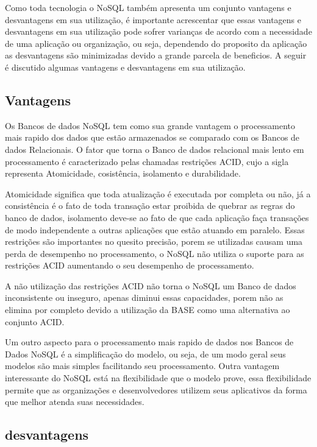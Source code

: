 \documentclass[12pt]{article}
\begin{document}
Como toda tecnologia o NoSQL também apresenta um conjunto vantagens e desvantagens em sua utilização, é importante acrescentar que essas vantagens e desvantagens em sua utilização pode sofrer varianças de acordo com a necessidade de uma aplicação ou organização, ou seja, dependendo do proposito da aplicação as desvantagens são minimizadas devido a grande parcela de beneficios. A seguir é discutido algumas vantagens e desvantagens em sua utilização.

\subsection{Vantagens}
\label{subsec:vantagens}

Os Bancos de dados NoSQL tem como sua grande vantagem o processamento mais rapido dos dados que estão armazenados se comparado com os Bancos de dados Relacionais. O fator que torna o Banco de dados relacional mais lento em processamento é caracterizado pelas chamadas restrições ACID, cujo a sigla representa Atomicidade, cosistência, isolamento e durabilidade. 

Atomicidade significa que toda atualização é executada por completa ou não, já a consistência é o fato de toda transação estar proibida de quebrar as regras do banco de dados, isolamento deve-se ao fato de que cada aplicação faça transações de modo independente a outras aplicações que estão atuando em paralelo. Essas restrições são importantes no quesito precisão, porem se utilizadas causam uma perda de desempenho no processamento, o NoSQL não utiliza o suporte para as restrições ACID aumentando o seu desempenho de processamento.\cite{leavitt:2010}

A não utilização das restrições ACID não torna o NoSQL um Banco de dados inconsistente ou inseguro, apenas diminui essas capacidades, porem não as elimina por completo devido a utilização da BASE como uma alternativa ao conjunto ACID.\cite{pritchett:2008}

Um outro aspecto para o processamento mais rapido de dados nos Bancos de Dados NoSQL é a simplificação do modelo, ou seja, de um modo geral seus modelos são mais simples facilitando seu processamento. Outra vantagem interessante do NoSQL está na flexibilidade que o modelo prove, essa flexibilidade permite que as organizações e desenvolvedores utilizem seus aplicativos da forma que melhor atenda suas necessidades.\cite{leavitt:2010}

\subsection{desvantagens}
\label{subsec:desvantagens}
\end{document}
